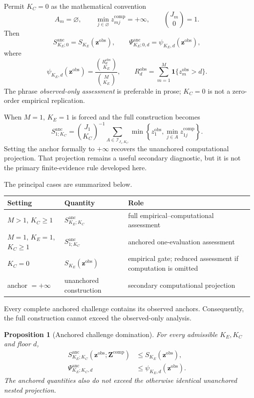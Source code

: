 \documentclass[11pt]{article}
\newcommand{\Sanc}{S^{\mathrm{anc}}}
\newcommand{\Psianc}{\Psi^{\mathrm{anc}}}
\newtheorem{proposition}{Proposition}
\theoremstyle{remark}
\begin{document}
Permit $K_C=0$ as the mathematical convention
\[
A_m=\varnothing,
\qquad
\min_{j\in\varnothing}z_{mj}^{\mathrm{comp}}=+\infty,
\qquad
\binom{J_m}{0}=1.
\]
Then
\begin{equation}
\Sanc_{K_E;0}
=S_{K_E}(\mathbf z^{\mathrm{obs}}),
\qquad
\Psianc_{K_E;0,d}
=\psi_{K_E,d}(\mathbf z^{\mathrm{obs}}),
\label{eq:observed-boundary}
\end{equation}
where
\[
\psi_{K_E,d}(\mathbf z^{\mathrm{obs}})
=
\frac{\binom{R_d^{\mathrm{obs}}}{K_E}}
{\binom{M}{K_E}},
\qquad
R_d^{\mathrm{obs}}
=
\sum_{m=1}^M\mathbf 1\{z_m^{\mathrm{obs}}>d\}.
\]
The phrase \emph{observed-only assessment} is preferable in prose;
$K_C=0$ is not a zero-order empirical replication.

When $M=1$, $K_E=1$ is forced and the full construction becomes
\begin{equation}
\Sanc_{1;K_C}
=
\binom{J_1}{K_C}^{-1}
\sum_{A\in\mathcal I_{J_1,K_C}}
\min\left\{z_1^{\mathrm{obs}},
\min_{j\in A}z_{1j}^{\mathrm{comp}}\right\}.
\label{eq:one-evaluation-boundary}
\end{equation}
Setting the anchor formally to $+\infty$ recovers the unanchored computational
projection. That projection remains a useful secondary
diagnostic, but it is not the primary finite-evidence rule developed here.

The principal cases are summarized below.
\begin{center}
\begin{tabularx}{0.96\textwidth}{@{}lX X@{}}
\toprule
Setting & Quantity & Role \\
\midrule
$M>1$, $K_C\geq1$ & $\Sanc_{K_E;K_C}$ & full empirical--computational assessment \\
$M=1$, $K_E=1$, $K_C\geq1$ & $\Sanc_{1;K_C}$ & anchored one-evaluation assessment \\
$K_C=0$ & $S_{K_E}(\mathbf z^{\mathrm{obs}})$ & empirical gate; reduced assessment if computation is omitted \\
anchor $=+\infty$ & unanchored construction & secondary computational projection \\
\bottomrule
\end{tabularx}
\end{center}

Every complete anchored challenge contains its observed anchors. Consequently,
the full construction cannot exceed the observed-only analysis.

\begin{proposition}[Anchored challenge domination]
\label{prop:anchor-domination}
For every admissible $K_E,K_C$ and floor $d$,
\begin{align}
\Sanc_{K_E;K_C}
\left(\mathbf z^{\mathrm{obs}};\mathbf Z^{\mathrm{comp}}\right)
&\leq
S_{K_E}(\mathbf z^{\mathrm{obs}}),
\label{eq:magnitude-domination}\\
\Psianc_{K_E;K_C,d}
&\leq
\psi_{K_E,d}(\mathbf z^{\mathrm{obs}}).
\label{eq:survival-domination}
\end{align}
The anchored quantities also do not exceed the otherwise identical unanchored
nested projection.
\end{proposition}
\end{document}
